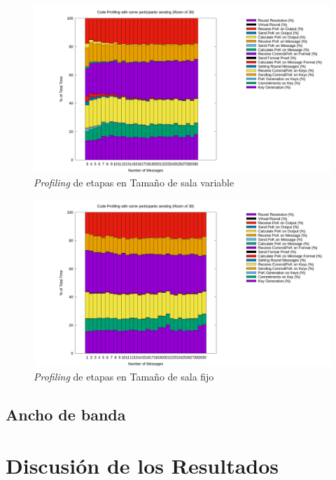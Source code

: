 \begin{figure}[h]
  \centering
    \includegraphics[scale=0.3]{logs/logs_all/profile.png}
  \caption{\emph{Profiling} de etapas en Tamaño de sala variable}
\end{figure}

\begin{figure}[h]
  \centering
    \includegraphics[scale=0.3]{logs/logs_partial_30/profile.png}
  \caption{\emph{Profiling} de etapas en Tamaño de sala fijo}
\end{figure}

\subsection{Ancho de banda}

\section{Discusión de los Resultados}